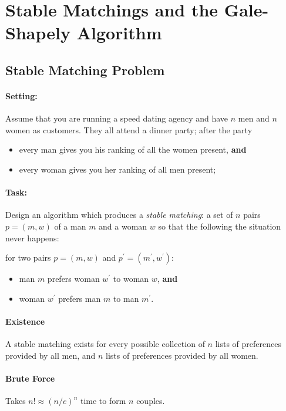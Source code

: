 
\section{Stable Matchings and the Gale-Shapely Algorithm}

\subsection{Stable Matching Problem}
\paragraph{Setting:}
Assume that you are running a speed dating agency and have $n$ men and
$n$ women as customers. They all attend a dinner party; after the party
\begin{itemize}
    \item every man gives you his ranking of all the women present, \textbf{and}
    \item every woman gives you her ranking of all men present;
\end{itemize}

\paragraph{Task:}
Design an algorithm which produces a \textit{stable matching}: 
a set of $n$ pairs $p=(m,w)$ of a man $m$ and a woman $w$ so that the following
the situation never happens:


for two pairs $p=(m,w)$ and $p^\prime=(m^\prime, w^\prime)$:
\begin{itemize}
    \item man $m$ prefers woman $w^\prime$ to woman $w$, \textbf{and}
    \item woman $w^\prime$ prefers man $m$ to man $m^\prime$.
\end{itemize}

\paragraph{Existence} A stable matching exists for every possible collection
of $n$ lists of preferences provided by all men, and $n$ lists of preferences 
provided by all women.

\paragraph{Brute Force} Takes $n! \approx (n/e)^n$ time to form $n$ couples.

